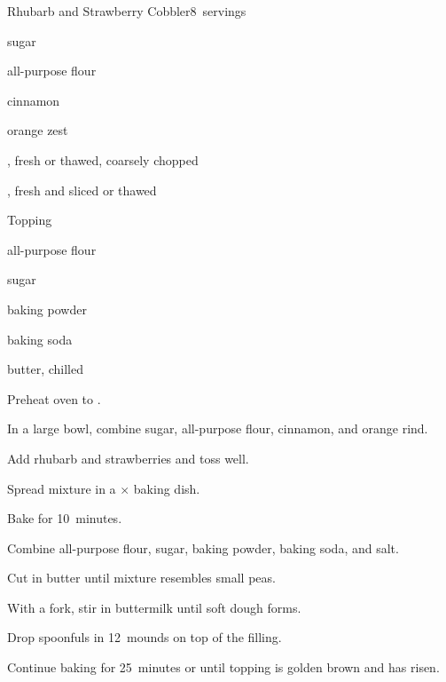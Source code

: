 \begin{recipe}{Rhubarb and Strawberry Cobbler}{}{8~servings}

\begin{ingredients}
\item \C{1\quarter} sugar
\item {} all-purpose flour
\item \tp{1\half} cinnamon
\item \tp{1\half} orange zest
\item {} , fresh or thawed, coarsely chopped
\item {} , fresh and sliced or thawed
\end{ingredients}

Topping
\begin{ingredients}
\item \C{1\half} all-purpose flour
\item {} sugar
\item \tp{1\half} baking powder
\item \tp{\half} baking soda
\item {} butter, chilled
\item {} 
\end{ingredients}

\begin{directions}
\item Preheat oven to .
\item In a large bowl, combine \C{1\quarter} sugar,  all-purpose flour, cinnamon, and orange rind.
\item Add rhubarb and strawberries and toss well.
\item Spread mixture in a $\times$ baking dish.
\item Bake for 10~minutes.
\item Combine \C{1\half} all-purpose flour,  sugar, baking powder, baking soda, and salt.
\item Cut in butter until mixture resembles small peas.
\item With a fork, stir in buttermilk until soft dough forms.
\item Drop spoonfuls in 12~mounds on top of the filling.
\item Continue baking for 25~minutes or until topping is golden brown and has risen.
\end{directions}

\end{recipe}

